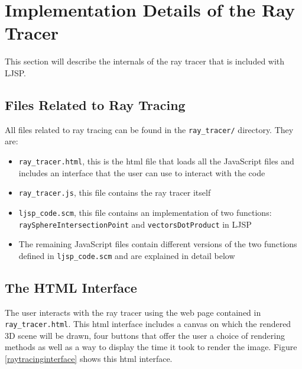 \documentclass[11pt]{report}
\begin{document}
\section{Implementation Details of the Ray Tracer}
This section will describe the internals of the ray tracer that is included with LJSP.

\subsection{Files Related to Ray Tracing}
All files related to ray tracing can be found in the \texttt{ray_tracer/} directory. They are:
\begin{itemize}
\item \texttt{ray_tracer.html}, this is the html file that loads all the JavaScript files and includes an interface that the user can use to interact with the code
\item \texttt{ray_tracer.js}, this file contains the ray tracer itself
\item \texttt{ljsp_code.scm}, this file contains an implementation of two functions: \texttt{raySphereIntersectionPoint} and \texttt{vectorsDotProduct} in LJSP
\item The remaining JavaScript files contain different versions of the two functions defined in \texttt{ljsp_code.scm} and are explained in detail below
\end{itemize}


\subsection{The HTML Interface}
The user interacts with the ray tracer using the web page contained in \texttt{ray_tracer.html}. This html interface includes a canvas on which the rendered 3D scene will be drawn, four buttons that offer the user a choice of rendering methods as well as a way to display the time it took to render the image. Figure \ref{raytracinginterface} shows this html interface.
\end{document}
